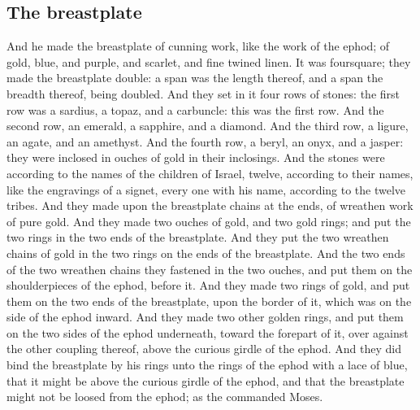 \begin{biblechapter}
\section*{The breastplate}
\verse And he made the breastplate of cunning work, like the work of the ephod; of gold, blue, and purple, and scarlet, and fine twined linen.
\verse It was foursquare; they made the breastplate double: a span was the length thereof, and a span the breadth thereof, being doubled.
\verse And they set in it four rows of stones: the first row was a sardius, a topaz, and a carbuncle: this was the first row.
\verse And the second row, an emerald, a sapphire, and a diamond.
\verse And the third row, a ligure, an agate, and an amethyst.
\verse And the fourth row, a beryl, an onyx, and a jasper: they were inclosed in ouches of gold in their inclosings.
\verse And the stones were according to the names of the children of Israel, twelve, according to their names, like the engravings of a signet, every one with his name, according to the twelve tribes.
\verse And they made upon the breastplate chains at the ends, of wreathen work of pure gold.
\verse And they made two ouches of gold, and two gold rings; and put the two rings in the two ends of the breastplate.
\verse And they put the two wreathen chains of gold in the two rings on the ends of the breastplate.
\verse And the two ends of the two wreathen chains they fastened in the two ouches, and put them on the shoulderpieces of the ephod, before it.
\verse And they made two rings of gold, and put them on the two ends of the breastplate, upon the border of it, which was on the side of the ephod inward.
\verse And they made two other golden rings, and put them on the two sides of the ephod underneath, toward the forepart of it, over against the other coupling thereof, above the curious girdle of the ephod.
\verse And they did bind the breastplate by his rings unto the rings of the ephod with a lace of blue, that it might be above the curious girdle of the ephod, and that the breastplate might not be loosed from the ephod; as the \LORD commanded Moses.

\end{biblechapter}
